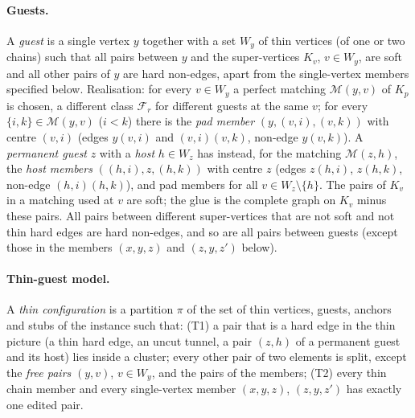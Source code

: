 \paragraph{Guests.} A \emph{guest} is a single vertex $y$ together with a set $W_y$ of thin vertices (of one or two chains) such that all pairs between $y$ and the super-vertices $K_v$, $v\in W_y$, are soft and all other pairs of $y$ are hard non-edges, apart from the single-vertex members specified below. Realisation: for every $v\in W_y$ a perfect matching $\mathcal M(y,v)$ of $K_p$ is chosen, a different class $\mathcal F_r$ for different guests at the same $v$; for every $\{i,k\}\in\mathcal M(y,v)$ ($i<k$) there is the \emph{pad member} $(y,(v,i),(v,k))$ with centre $(v,i)$ (edges $y(v,i)$ and $(v,i)(v,k)$, non-edge $y(v,k)$). A \emph{permanent guest} $z$ with a \emph{host} $h\in W_z$ has instead, for the matching $\mathcal M(z,h)$, the \emph{host members} $((h,i),z,(h,k))$ with centre $z$ (edges $z(h,i)$, $z(h,k)$, non-edge $(h,i)(h,k)$), and pad members for all $v\in W_z\setminus\{h\}$. The pairs of $K_v$ in a matching used at $v$ are soft; the glue is the complete graph on $K_v$ minus these pairs. All pairs between different super-vertices that are not soft and not thin hard edges are hard non-edges, and so are all pairs between guests (except those in the members $(x,y,z)$ and $(z,y,z')$ below).

\paragraph{Thin-guest model.} A \emph{thin configuration} is a partition $\pi$ of the set of thin vertices, guests, anchors and stubs of the instance such that: (T1) a pair that is a hard edge in the thin picture (a thin hard edge, an uncut tunnel, a pair $(z,h)$ of a permanent guest and its host) lies inside a cluster; every other pair of two elements is split, except the \emph{free pairs} $(y,v)$, $v\in W_y$, and the pairs of the members; (T2) every thin chain member and every single-vertex member $(x,y,z)$, $(z,y,z')$ has exactly one edited pair.

